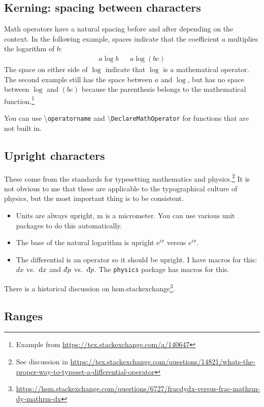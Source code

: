 \subsection{Kerning: spacing between characters}
Math operators have a natural spacing before and after depending on the context. In the following example, spaces indicate that the coefficient $a$ multiplies the logarithm of $b$:
\begin{align}
	a\log b && a\log(bc)
\end{align}
The space on either side of $\log$ indicate that $\log$ is a mathematical operator. The second example still has the space between $a$ and $\log$, but has no space between $\log$ and $(bc)$ because the parenthesis belongs to the mathematical function.\footnote{Example from \url{https://tex.stackexchange.com/a/140647}}

You can use \textbackslash\texttt{operatorname} and \textbackslash\texttt{DeclareMathOperator} for functions that are not built in.

\subsection{Upright characters}
These come from the  standards for typesetting mathematics and physics.\footnote{See discussion in \url{https://tex.stackexchange.com/questions/14821/whats-the-proper-way-to-typeset-a-differential-operator}} It is not obvious to me that these are applicable to the typographical culture of physics, but the most important thing is to be consistent.
\begin{itemize}
	\item Units are always upright, \textmu m is a micrometer. You can use various unit packages to do this automatically. 
	\item The base of the natural logarithm is upright $\mathrm{e}^{i\pi}$ versus $e^{i\pi}$.
	\item The differential is an operator so it should be upright. I have macros for this: $dx$ vs.~$\operatorname{d}\!{x}$ and $\dbar p$ vs.~$\Dbar{p}$. The \texttt{physics} package has macros for this. 
\end{itemize}
There is a historical discussion on hsm.stackexchange\footnote{\url{https://hsm.stackexchange.com/questions/6727/fracdydx-versus-frac-mathrm-dy-mathrm-dx}}.


\subsection{Ranges}

